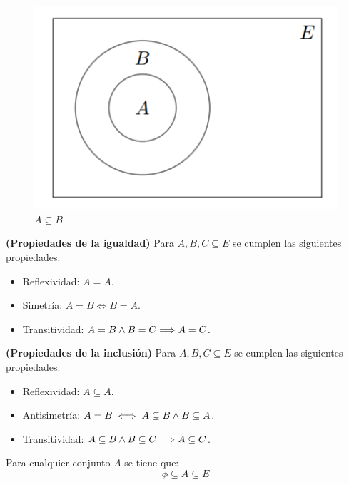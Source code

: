 \begin{figure}[H]
	\begin{center}
		\includegraphics[scale=0.8]{figuras/capitulo1/02-conjuntos/inclusion.png}
		\caption{$A \subseteq B$}
	\end{center}
\end{figure}

\begin{proposicion}
		\textbf{(Propiedades de la igualdad)}
		Para $A, B, C \subseteq E$ se cumplen las siguientes propiedades: 
		\begin{itemize}
			\item Reflexividad: $A = A$. 
			\item Simetría: $A = B \iff B  = A$. 
			\item Transitividad: $A = B \wedge B = C \Longrightarrow A = C$. 
		\end{itemize}
\end{proposicion}

\begin{proposicion}
	\textbf{(Propiedades de la inclusión)}
	Para $A, B, C \subseteq E$ se cumplen las siguientes propiedades: 
	\begin{itemize}
		\item Reflexividad: $A \subseteq A$. 
		\item Antisimetría: $A = B \iff A \subseteq B \wedge B \subseteq A$. 
		\item Transitividad: $A \subseteq B \wedge B \subseteq C \Longrightarrow A \subseteq C$. 
	\end{itemize}
\end{proposicion}

\begin{proposicion}
	Para cualquier conjunto $A$ se tiene que: 
	$$ \phi \subseteq A \subseteq E $$ 
\end{proposicion}

